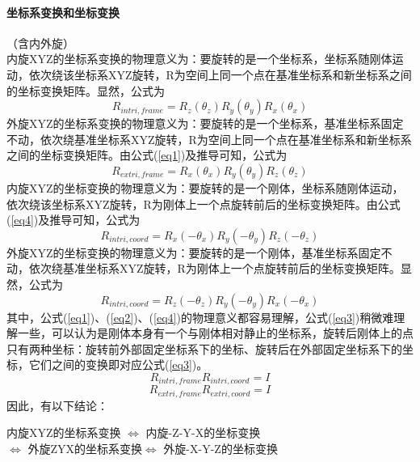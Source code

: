 \documentclass{ctexart}
\begin{document}
	\paragraph{坐标系变换和坐标变换}（含内外旋）
	\\
	内旋XYZ的坐标系变换的物理意义为：要旋转的是一个坐标系，坐标系随刚体运动，依次绕该坐标系XYZ旋转，R为空间上同一个点在基准坐标系和新坐标系之间的坐标变换矩阵。显然，公式为
	\begin{equation}
	R_{intri,frame}=R_z(\theta_z) R_y(\theta_y) R_x(\theta_x) \label{eq1}
	\end{equation}
	外旋XYZ的坐标系变换的物理意义为：要旋转的是一个坐标系，基准坐标系固定不动，依次绕基准坐标系XYZ旋转，R为空间上同一个点在基准坐标系和新坐标系之间的坐标变换矩阵。由公式(\ref{eq1})及推导可知，公式为
	\begin{equation}
	R_{extri,frame}=R_x(\theta_x) R_y(\theta_y) R_z(\theta_z) \label{eq2}
	\end{equation}
	内旋XYZ的坐标变换的物理意义为：要旋转的是一个刚体，坐标系随刚体运动，依次绕该坐标系XYZ旋转，R为刚体上一个点旋转前后的坐标变换矩阵。由公式(\ref{eq4})及推导可知，公式为
	\begin{equation}
	R_{intri,coord}=R_x(-\theta_x) R_y(-\theta_y) R_z(-\theta_z) \label{eq3}
	\end{equation}
	外旋XYZ的坐标变换的物理意义为：要旋转的是一个刚体，基准坐标系固定不动，依次绕基准坐标系XYZ旋转，R为刚体上一个点旋转前后的坐标变换矩阵。显然，公式为
	\begin{equation}
	R_{intri,coord}=R_z(-\theta_z) R_y(-\theta_y) R_x(-\theta_x) \label{eq4}
	\end{equation}
	其中，公式(\ref{eq1})、(\ref{eq2})、(\ref{eq4})的物理意义都容易理解，公式(\ref{eq3})稍微难理解一些，可以认为是刚体本身有一个与刚体相对静止的坐标系，旋转后刚体上的点只有两种坐标：旋转前外部固定坐标系下的坐标、旋转后在外部固定坐标系下的坐标，它们之间的变换即对应公式(\ref{eq3})。
	\begin{equation}
	R_{intri,frame} R_{intri,coord} = I
	\end{equation}
	\begin{equation}
	R_{extri,frame} R_{extri,coord} = I
	\end{equation}
	因此，有以下结论：
	\begin{center}
		\footnotesize 内旋XYZ的坐标系变换	$\Leftrightarrow$ 内旋-Z-Y-X的坐标变换
		\\
		$\Leftrightarrow$ 外旋ZYX的坐标系变换$\Leftrightarrow$ 外旋-X-Y-Z的坐标变换
	\end{center}
	
\end{document}
